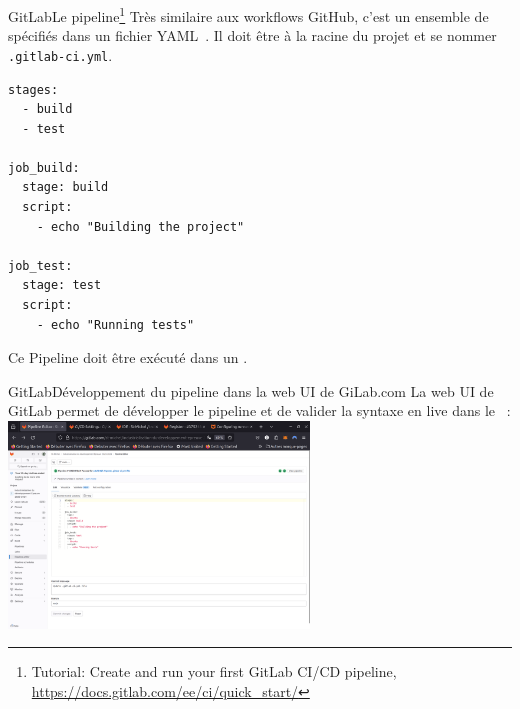 \documentclass{beamer}
\begin{document}
    \begin{frame}[fragile]{GitLab}{Le pipeline\footnote{Tutorial: Create and run your first GitLab CI/CD pipeline, \url{https://docs.gitlab.com/ee/ci/quick_start/}}}
        \transdissolve
        Très similaire aux workflows GitHub, c'est un ensemble de  spécifiés dans un fichier YAML~.
        \bigbreak
        Il doit être à la racine du projet et se nommer \lstinline{.gitlab-ci.yml}.
        \begin{lstlisting}[basicstyle=\ttfamily\tiny]
stages:
  - build
  - test

job_build:
  stage: build
  script:
    - echo "Building the project"

job_test:
  stage: test
  script:
    - echo "Running tests"
        \end{lstlisting}
        Ce Pipeline doit être exécuté dans un .
    \end{frame}

    \begin{frame}{GitLab}{Développement du pipeline dans la web UI de GiLab.com}
        \transdissolve
        La web UI de GitLab permet de développer le pipeline et de valider la syntaxe en live dans le ~:
        \bigbreak
        \centering
        \includegraphics[width=8cm]{image/gitlab-pipeline-editor}
    \end{frame}
\end{document}
